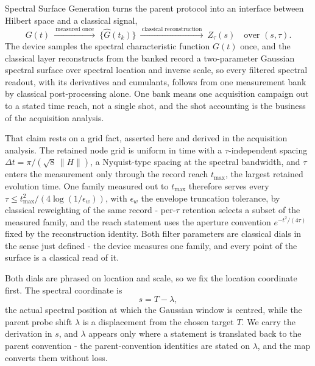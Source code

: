 Spectral Surface Generation turns the parent protocol \cite{mccaul2025snacks} into an interface between Hilbert space and a classical signal,
\begin{equation}\label{def:spectral-surfacing}
G(t)\ \xrightarrow{\ \text{measured once}\ }\ \bigl\{\widehat G(t_k)\bigr\}\ \xrightarrow{\ \text{classical reconstruction}\ }\ Z_\tau(s)\quad \text{over } (s,\tau).
\end{equation}
The device samples the spectral characteristic function $G(t)$ once, and the classical layer reconstructs from the banked record a two-parameter Gaussian spectral surface over spectral location and inverse scale, so every filtered spectral readout, with its derivatives and cumulants, follows from one measurement bank by classical post-processing alone. One bank means one acquisition campaign out to a stated time reach, not a single shot, and the shot accounting is the business of the acquisition analysis.

That claim rests on a grid fact, asserted here and derived in the acquisition analysis. The retained node grid is uniform in time with a $\tau$-independent spacing $\Delta t=\pi/(\sqrt{8}\,\|H\|)$, a Nyquist-type spacing at the spectral bandwidth, and $\tau$ enters the measurement only through the record reach $t_{\max}$, the largest retained evolution time. One family measured out to $t_{\max}$ therefore serves every $\tau\le t_{\max}^{2}/(4\log(1/\epsilon_w))$, with $\epsilon_w$ the envelope truncation tolerance, by classical reweighting of the same record - per-$\tau$ retention selects a subset of the measured family, and the reach statement uses the aperture convention $e^{-t^{2}/(4\tau)}$ fixed by the reconstruction identity. Both filter parameters are classical dials in the sense just defined - the device measures one family, and every point of the surface is a classical read of it.

Both dials are phrased on location and scale, so we fix the location coordinate first. The spectral coordinate is
\begin{equation}\label{def:spectral-coordinate-s}
s = T - \lambda,
\end{equation}
the actual spectral position at which the Gaussian window is centred, while the parent probe shift $\lambda$ is a displacement from the chosen target $T$. We carry the derivation in $s$, and $\lambda$ appears only where a statement is translated back to the parent convention - the parent-convention identities are stated on $\lambda$, and the map converts them without loss.

